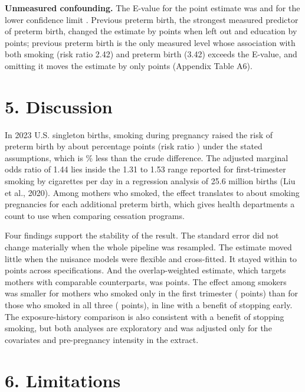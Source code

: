 \documentclass[11pt,letterpaper]{article}
\begin{document}
\textbf{Unmeasured confounding.} The E-value for the point estimate was \EV{} and for the lower confidence limit \EVlo{}. Previous preterm birth, the strongest measured predictor of preterm birth, changed the estimate by \PPChange{} points when left out and education by \EducChange{} points; previous preterm birth is the only measured level whose association with both smoking (risk ratio 2.42) and preterm birth (3.42) exceeds the E-value, and omitting it moves the estimate by only \PPChange{} points (Appendix Table A6).

\section*{5. Discussion}

In 2023 U.S. singleton births, smoking during pregnancy raised the risk of preterm birth by about \RDmain{} percentage points (risk ratio \RRmain{}) under the stated assumptions, which is \ReducePct{}\% less than the crude difference. The adjusted marginal odds ratio of 1.44 lies inside the 1.31 to 1.53 range reported for first-trimester smoking by cigarettes per day in a regression analysis of 25.6 million births (Liu et al., 2020). Among mothers who smoked, the effect translates to about \OneIn{} smoking pregnancies for each additional preterm birth, which gives health departments a count to use when comparing cessation programs.

Four findings support the stability of the result. The standard error did not change materially when the whole pipeline was resampled. The estimate moved little when the nuisance models were flexible and cross-fitted. It stayed within \RangeMin{} to \RangeMax{} points across specifications. And the overlap-weighted estimate, which targets mothers with comparable counterparts, was \ATO{} points. The effect among smokers was smaller for mothers who smoked only in the first trimester (\TriAATT{} points) than for those who smoked in all three (\TriCATT{} points), in line with a benefit of stopping early. The exposure-history comparison is also consistent with a benefit of stopping smoking, but both analyses are exploratory and was adjusted only for the covariates and pre-pregnancy intensity in the extract.

\section*{6. Limitations}
\end{document}
